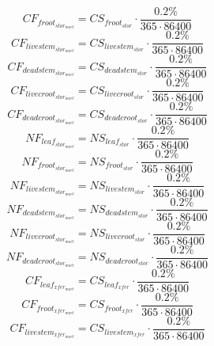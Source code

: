 \begin{equation}
  CF_{froot_{{stor}_{mort}}}=CS_{froot_{stor}}\cdot \frac{0.2\%}{365\cdot 86400}
\end{equation}
\begin{equation}
CF_{livestem_{{stor}_{mort}}}=CS_{livestem_{stor}}\cdot \frac{0.2\%}{365\cdot 86400}
\end{equation}
\begin{equation}
  CF_{deadstem_{{stor}_{mort}}}=CS_{deadstem_{stor}}\cdot \frac{0.2\%}{365\cdot 86400}
\end{equation}
\begin{equation}
  CF_{livecroot_{{stor}_{mort}}}=CS_{livecroot_{stor}}\cdot \frac{0.2\%}{365\cdot 86400}
\end{equation}
\begin{equation}
  CF_{deadcroot_{{stor}_{mort}}}=CS_{deadcroot_{stor}}\cdot \frac{0.2\%}{365\cdot 86400}
\end{equation}
\begin{equation}
  NF_{leaf_{{stor}_{mort}}}=NS_{leaf_{stor}}\cdot \frac{0.2\%}{365\cdot 86400}
\end{equation}
\begin{equation}
  NF_{froot_{{stor}_{mort}}}=NS_{froot_{stor}}\cdot \frac{0.2\%}{365\cdot 86400}
\end{equation}
\begin{equation}
  NF_{livestem_{{stor}_{mort}}}=NS_{livestem_{stor}}\cdot \frac{0.2\%}{365\cdot 86400}
\end{equation}
\begin{equation}
  NF_{deadstem_{{stor}_{mort}}}=NS_{deadstem_{stor}}\cdot \frac{0.2\%}{365\cdot 86400}
\end{equation}
\begin{equation}
  NF_{livecroot_{{stor}_{mort}}}=NS_{livecroot_{stor}}\cdot \frac{0.2\%}{365\cdot 86400}
\end{equation}
\begin{equation}
  NF_{deadcroot_{{stor}_{mort}}}=NS_{deadcroot_{stor}}\cdot \frac{0.2\%}{365\cdot 86400}
\end{equation}
\begin{equation}
  CF_{leaf_{{xfer}_{mort}}}=CS_{leaf_{xfer}}\cdot \frac{0.2\%}{365\cdot 86400}
\end{equation}
\begin{equation}
  CF_{froot_{{xfer}_{mort}}}=CS_{froot_{xfer}}\cdot \frac{0.2\%}{365\cdot 86400}
\end{equation}
\begin{equation}
  CF_{livestem_{{xfer}_{mort}}}=CS_{livestem_{xfer}}\cdot \frac{0.2\%}{365\cdot 86400}
\end{equation}
